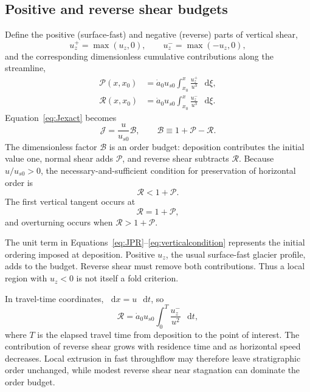 \documentclass[review]{igs}
\begin{document}
\subsection{Positive and reverse shear budgets}

Define the positive (surface-fast) and negative (reverse) parts of vertical shear,
\begin{equation}
 u_z^+=\max(u_z,0),
 \qquad
 u_z^-=\max(-u_z,0),
\end{equation}
and the corresponding dimensionless cumulative contributions along the streamline,
\begin{align}
\mathcal{P}(x,x_0)
&=\dot a_0u_{s0}
\int_{x_0}^{x}\frac{u_z^+}{u^3}\,\mathop{}\!\mathrm{d}\xi,
\label{eq:Pdef}\\
\mathcal{R}(x,x_0)
&=\dot a_0u_{s0}
\int_{x_0}^{x}\frac{u_z^-}{u^3}\,\mathop{}\!\mathrm{d}\xi.
\label{eq:Rdef}
\end{align}
Equation~\ref{eq:Jexact} becomes
\begin{equation}
\mathcal{J}=\frac{u}{u_{s0}}\mathcal{B},
\qquad
\mathcal{B}\equiv1+\mathcal{P}-\mathcal{R}.
\label{eq:JPR}
\end{equation}
The dimensionless factor \(\mathcal{B}\) is an order budget: deposition contributes the initial value one, normal shear adds \(\mathcal{P}\), and reverse shear subtracts \(\mathcal{R}\). Because \(u/u_{s0}>0\), the necessary-and-sufficient condition for preservation of horizontal order is
\begin{equation}
\mathcal{R}<1+\mathcal{P}.
\label{eq:ordercondition}
\end{equation}
The first vertical tangent occurs at
\begin{equation}
\mathcal{R}=1+\mathcal{P},
\label{eq:verticalcondition}
\end{equation}
and overturning occurs when \(\mathcal{R}>1+\mathcal{P}\).

The unit term in Equations~\ref{eq:JPR}--\ref{eq:verticalcondition} represents the initial ordering imposed at deposition. Positive \(u_z\), the usual surface-fast glacier profile, adds to the budget. Reverse shear must remove both contributions. Thus a local region with \(u_z<0\) is not itself a fold criterion.

In travel-time coordinates, \(\mathop{}\!\mathrm{d} x=u\,\mathop{}\!\mathrm{d} t\), so
\begin{equation}
\mathcal{R}
=\dot a_0u_{s0}
\int_0^T\frac{u_z^-}{u^2}\,\mathop{}\!\mathrm{d} t,
\label{eq:Rtime}
\end{equation}
where \(T\) is the elapsed travel time from deposition to the point of interest. The contribution of reverse shear grows with residence time and as horizontal speed decreases. Local extrusion in fast throughflow may therefore leave stratigraphic order unchanged, while modest reverse shear near stagnation can dominate the order budget.
\end{document}
